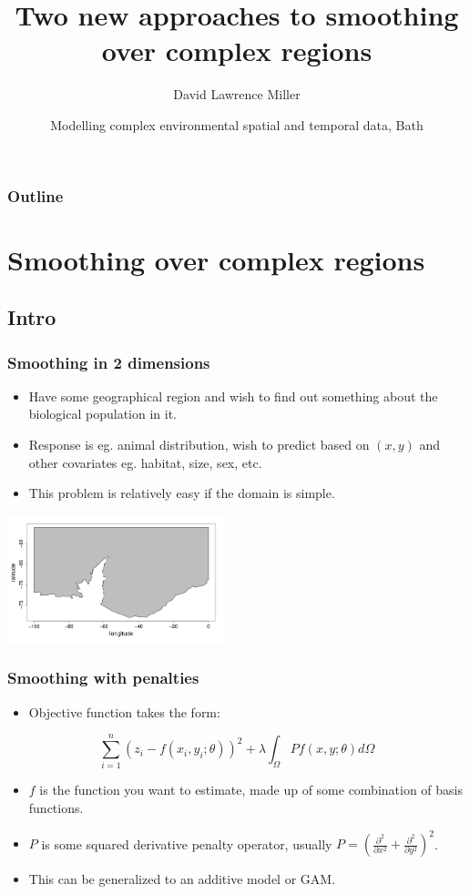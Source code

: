 \documentclass[ignorenonframetext]{beamer} %
\title[Smoothing over complex regions]{Two new approaches to smoothing over complex regions}
\author[Miller]{David Lawrence Miller}
\institute{Mathematical Sciences\\University of Bath}
\date[23-25 June 2009] {Modelling complex environmental spatial and temporal data, Bath}
\newcommand{\bc}{\begin{center}}
\newcommand{\ec}{\end{center}}
\newcommand{\bi}{\begin{itemize}}
\newcommand{\ei}{\end{itemize}}
\begin{document}
\begin{frame}
  \titlepage
\end{frame}


 {
\begin{frame}
  \frametitle{Outline}
  \tableofcontents %
\end{frame}
}

\section{Smoothing over complex regions}

\subsection{Intro}

\begin{frame}
	\frametitle{Smoothing in 2 dimensions}
       \bi
         \item Have some geographical region and wish to find out something about the biological population in it. 
         \item Response is eg. animal distribution, wish to predict based on $(x,y)$ and other covariates eg. habitat, size, sex, etc.
         \item This problem is relatively easy if the domain is simple.
       \ei
       \bc
         \includegraphics[width=2.5in]{figs/peninsula}
       \ec
\end{frame}

\begin{frame}
	\frametitle{Smoothing with penalties}
      \bi
         \item Objective function takes the form:
      \ei
      \bc
      \begin{equation*}
      \sum_{i=1}^n (z_i-f(x_i,y_i;\theta))^2 + \lambda \int_\Omega Pf(x,y;\theta)d\Omega
      \end{equation*}
      \ec
      \bi
         \item $f$ is the function you want to estimate, made up of some combination of basis functions.
         \item $P$ is some squared derivative penalty operator, usually $P=(\frac{\partial^2}{\partial x^2}+\frac{\partial^2}{\partial y^2})^2$.
         \item This can be generalized to an additive model or GAM.
      \ei
\end{frame}
\end{document}
